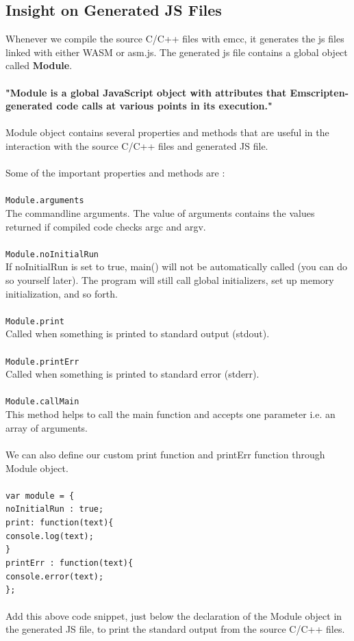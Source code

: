 \documentclass[12pt]{article}
\begin{document}
\subsection{Insight on Generated JS Files}
Whenever we compile the source C/C++ files with emcc, it generates the js files linked with either WASM or asm.js. The generated js file contains a global object called \textbf{Module}.\\ \\
\textbf{"Module is a global JavaScript object with attributes that Emscripten-generated code calls at various points in its execution."}\cite{EmscriptenCommon}
\\ \\
Module object contains several properties and methods that are useful in the interaction with the source C/C++ files and generated JS file.\\ \\
Some of the important properties and methods are :\\ \\
\texttt{Module.arguments}\\
The commandline arguments. The value of arguments contains the values returned if compiled code checks argc and argv.\\ \\
\texttt{Module.noInitialRun}\\
If noInitialRun is set to true, main() will not be automatically called (you can do so yourself later). The program will still call global initializers, set up memory initialization, and so forth.\\ \\
\texttt{Module.print}\\
Called when something is printed to standard output (stdout).\\ \\ 
\texttt{Module.printErr}\\
Called when something is printed to standard error (stderr).\\ \\
\texttt{Module.callMain}\\
This method helps to call the main function and accepts one parameter i.e. an array of arguments.\\ \\
We can also define our custom print function and printErr function through Module object. \\ \\
\texttt{var module = \{ \\
    noInitialRun : true;\\
    print: function(text)\{ \\
   	 console.log(text); \\
    \} \\
    printErr : function(text)\{ \\
   	 console.error(text); \\
\};
}\\ \\
Add this above code snippet, just below the declaration of the Module object in the generated JS file, to print the standard output from the source C/C++ files.
\end{document}
